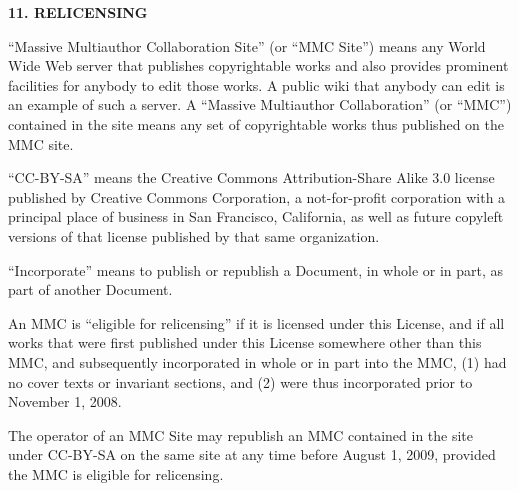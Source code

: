 \documentclass[]{report}
\theoremstyle{definition}
\theoremstyle{remark}
\theoremstyle{plain}
\numberwithin{equation}{chapter}
\begin{document}
\begin{multicols*}{2}
\begin{center}
	{\footnotesize\bf 11. RELICENSING\par}
\end{center}


``Massive Multiauthor Collaboration Site'' (or ``MMC Site'') means any
World Wide Web server that publishes copyrightable works and also
provides prominent facilities for anybody to edit those works.  A
public wiki that anybody can edit is an example of such a server.  A
``Massive Multiauthor Collaboration'' (or ``MMC'') contained in the
site means any set of copyrightable works thus published on the MMC
site.

``CC-BY-SA'' means the Creative Commons Attribution-Share Alike 3.0
license published by Creative Commons Corporation, a not-for-profit
corporation with a principal place of business in San Francisco,
California, as well as future copyleft versions of that license
published by that same organization.

``Incorporate'' means to publish or republish a Document, in whole or
in part, as part of another Document.

An MMC is ``eligible for relicensing'' if it is licensed under this
License, and if all works that were first published under this License
somewhere other than this MMC, and subsequently incorporated in whole
or in part into the MMC, (1) had no cover texts or invariant sections,
and (2) were thus incorporated prior to November 1, 2008.

The operator of an MMC Site may republish an MMC contained in the site
under CC-BY-SA on the same site at any time before August 1, 2009,
provided the MMC is eligible for relicensing.

\end{multicols*}
\end{document}
